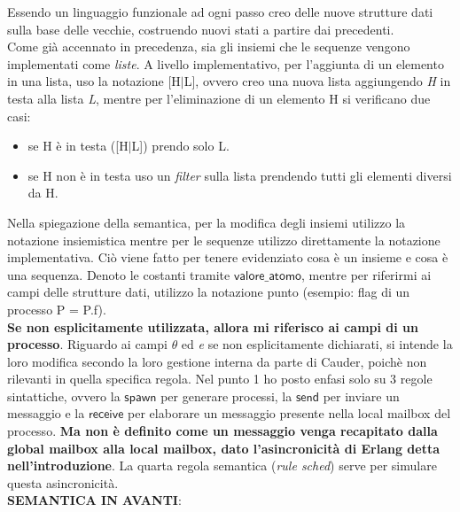 \documentclass[background.tex]{subfiles}
\begin{document}
Essendo un linguaggio funzionale ad ogni passo creo delle nuove strutture dati sulla base delle vecchie, costruendo nuovi stati a partire dai precedenti.\\
Come già accennato in precedenza, sia gli insiemi che le sequenze vengono implementati come \textit{liste}. A livello implementativo, per l'aggiunta di un elemento in una lista, uso la notazione [H$\mid$L], ovvero creo una nuova lista aggiungendo \textit{H} in testa alla lista \textit{L}, mentre per l'eliminazione di un elemento H si verificano due casi:
	\begin{itemize}
		\item se H è in testa ([H$\mid$L]) prendo solo L.
		\item se H non è in testa uso un \textit{filter} sulla lista prendendo tutti gli elementi diversi da H.
	\end{itemize}
Nella spiegazione della semantica, per la modifica degli insiemi utilizzo la notazione insiemistica mentre per le sequenze utilizzo direttamente la notazione implementativa.
Ciò viene fatto per tenere evidenziato cosa è un insieme e cosa è una sequenza.
Denoto le costanti tramite $\mathsf{valore\_atomo}$, mentre per riferirmi ai campi delle strutture dati, utilizzo la notazione punto (esempio: flag di un processo P = P.f).\\
\textbf{Se non esplicitamente utilizzata, allora mi riferisco ai campi di un processo}.
Riguardo ai campi $\theta$ ed \textit{e} se non esplicitamente dichiarati, si intende la loro modifica secondo la loro gestione interna da parte di Cauder, poichè non rilevanti in quella specifica regola.
Nel punto 1 ho posto enfasi solo su 3 regole sintattiche, ovvero la $\mathsf{spawn}$ per generare processi, la $\mathsf{send}$ per inviare un messaggio e la $\mathsf{receive}$ per elaborare un messaggio presente nella local mailbox del processo.
\textbf{Ma non è definito come un messaggio venga recapitato dalla global mailbox alla local mailbox, dato l'asincronicità di Erlang detta nell'introduzione}. La quarta regola semantica (\textit{rule sched}) serve per simulare questa asincronicità.\\
\textbf{SEMANTICA IN AVANTI}:
\end{document}
